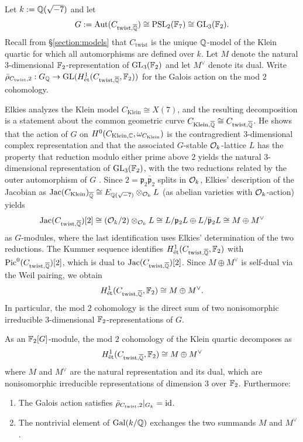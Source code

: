 \documentclass[main.tex]{subfiles}
\begin{document}
Let $k := \mathbb{Q}(\sqrt{-7})$ and let
\[
G := \operatorname{\mathrm{Aut}}(C_{\mathrm{twist}, \overline{\mathbb{Q}}}) \cong \mathrm{PSL}_2(\mathbb{F}_7) \cong \mathrm{GL}_3(\mathbb{F}_2).
\]
Recall from \S\ref{section:models} that $C_{\mathrm{twist}}$ is the unique $\mathbb{Q}$-model of the Klein quartic for which all automorphisms are defined over $k$. Let $M$ denote the natural $3$-dimensional $\mathbb{F}_2$-representation of $\mathrm{GL}_3(\mathbb{F}_2)$ and let $M^{\vee}$ denote its dual. Write $\bar{\rho}_{C_{\mathrm{twist}},2} : G_{\mathbb{Q}} \to \mathrm{GL}(H^1_{\mathrm{\acute{e}t}}(C_{\mathrm{twist},\overline{\mathbb{Q}}}, \mathbb{F}_2))$ for the Galois action on the mod $2$ \etale cohomology.
\par
Elkies analyzes the Klein model $C_{\mathrm{Klein}} \cong X(7)$, and the resulting decomposition is a statement about the common geometric curve $C_{\mathrm{Klein},\overline{\mathbb{Q}}} \cong C_{\mathrm{twist},\overline{\mathbb{Q}}}$. He shows that the action of $G$ on $H^0(C_{\mathrm{Klein},\mathbb{C}}, \omega_{C_{\mathrm{Klein}}})$ is the contragredient $3$-dimensional complex representation and that the associated $G$-stable $\mathcal{O}_k$-lattice $L$ has the property that reduction modulo either prime above $2$ yields the natural $3$-dimensional representation of $\mathrm{GL}_3(\mathbb{F}_2)$, with the two reductions related by the outer automorphism of $G$ \cite[\S\S1.4, 2.3]{elkies:klein_quartic}. Since $2 = \mathfrak{p}_2 \bar{\mathfrak{p}}_2$ splits in $\mathcal{O}_k$, Elkies' description of the Jacobian as $\operatorname{\mathrm{Jac}}(C_{\mathrm{Klein}})_{\overline{\mathbb{Q}}} \cong E_{\mathbb{Q}(\sqrt{-7})} \otimes_{\mathcal{O}_k} L$ (as abelian varieties with $\mathcal{O}_k$-action) yields
\[
\operatorname{\mathrm{Jac}}(C_{\mathrm{twist},\overline{\mathbb{Q}}})[2] \cong (\mathcal{O}_k / 2) \otimes_{\mathcal{O}_k} L \cong L / \mathfrak{p}_2 L \oplus L / \bar{\mathfrak{p}}_2 L \cong M \oplus M^{\vee}
\]
as $G$-modules, where the last identification uses Elkies' determination of the two reductions. The Kummer sequence identifies $H^1_{\mathrm{\acute{e}t}}(C_{\mathrm{twist},\overline{\mathbb{Q}}}, \mathbb{F}_2)$ with $\operatorname{\mathrm{Pic}}^0(C_{\mathrm{twist},\overline{\mathbb{Q}}})[2]$, which is dual to $\operatorname{\mathrm{Jac}}(C_{\mathrm{twist},\overline{\mathbb{Q}}})[2]$. Since $M \oplus M^{\vee}$ is self-dual via the Weil pairing, we obtain
\[
H^1_{\mathrm{\acute{e}t}}(C_{\mathrm{twist},\overline{\mathbb{Q}}}, \mathbb{F}_2) \cong M \oplus M^{\vee}.
\]
In particular, the mod $2$ \etale cohomology is the direct sum of two nonisomorphic irreducible $3$-dimensional $\mathbb{F}_2$-representations of $G$.

\begin{prop} \label{prop:klein_mod2_rep}
As an $\mathbb{F}_2[G]$-module, the mod $2$ \etale cohomology of the Klein quartic decomposes as
\[
H^1_{\mathrm{\acute{e}t}}(C_{\mathrm{twist},\overline{\mathbb{Q}}}, \mathbb{F}_2) \cong M \oplus M^{\vee}
\]
where $M$ and $M^{\vee}$ are the natural representation and its dual, which are nonisomorphic irreducible representations of dimension $3$ over $\mathbb{F}_2$. Furthermore:
\begin{enumerate}
\item[\emph{(i)}] The Galois action satisfies $\bar{\rho}_{C_{\mathrm{twist}},2}|_{G_k} = \mathrm{id}$.
\item[\emph{(ii)}] The nontrivial element of $\operatorname{\mathrm{Gal}}(k/\mathbb{Q})$ exchanges the two summands $M$ and $M^{\vee}$.
\end{enumerate}
\end{prop}
\end{document}
